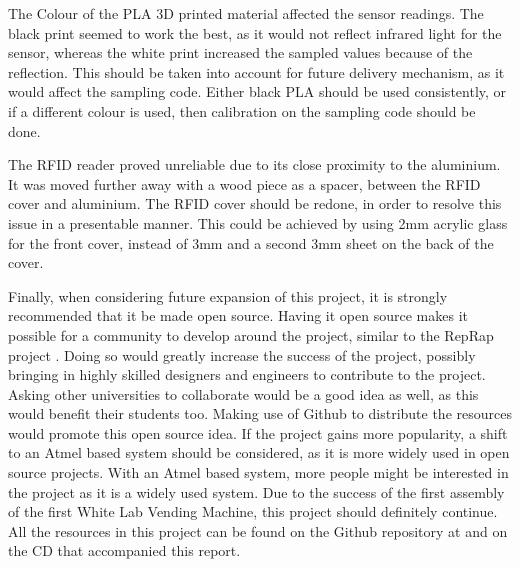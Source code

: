 \documentclass[a4paper,11pt]{article}
\numberwithin{figure}{section}
\numberwithin{table}{section}
\begin{document}
The Colour of the PLA 3D printed material affected the sensor readings. The black print seemed to work the best, as it would not reflect infrared light for the sensor, whereas the white print increased the sampled values because of the reflection. This should be taken into account for future delivery mechanism, as it would affect the sampling code. Either black PLA should be used consistently, or if a different colour is used, then calibration on the sampling code should be done.

The RFID reader proved unreliable due to its close proximity to the aluminium. It was moved further away with a wood piece as a spacer, between the RFID cover and aluminium. The RFID cover should be redone, in order to resolve this issue in a presentable manner. This could be achieved by using 2mm acrylic glass for the front cover, instead of 3mm and a second 3mm sheet on the back of the cover. 

Finally, when considering future expansion of this project, it is strongly recommended that it be made open source. Having it open source makes it possible for a community to develop around the project, similar to the RepRap project \cite{reprap}. Doing so would greatly increase the success of the project, possibly bringing in highly skilled designers and engineers to contribute to the project. Asking other universities to collaborate would be a good idea as well, as this would benefit their students too. Making use of Github to distribute the resources would promote this open source idea. If the project gains more popularity, a shift to an Atmel based system should be considered, as it is more widely used in open source projects. With an Atmel based system, more people might be interested in the project as it is a widely used system. Due to the success of the first assembly of the first White Lab Vending Machine, this project should definitely continue. All the resources in this project can be found on the Github repository at \cite{github} and on the CD that accompanied this report.
\newpage




\newpage
\end{document}
